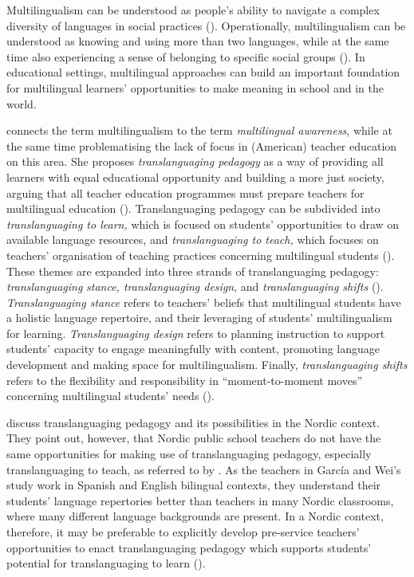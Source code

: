\documentclass[output=paper]{langscibook}
\begin{document}
Multilingualism can be understood as people’s ability to navigate a complex diversity of languages in social practices (\citealt{Hodge1988,Laursen2019}). Operationally, multilingualism can be understood as knowing and using more than two languages, while at the same time also experiencing a sense of belonging to specific social groups (\citealt{GarciaWei2014}). In educational settings, multilingual approaches can build an important foundation for multilingual learners’ opportunities to make meaning in school and in the world.

\begin{sloppypar}
\citet{Garcia2008} connects the term multilingualism to the term \textit{multilingual awareness}, while at the same time problematising the lack of focus in (American) teacher education on this area. She proposes \textit{translanguaging pedagogy} as a way of providing all learners with equal educational opportunity and building a more just society, arguing that all teacher education programmes must prepare teachers for multilingual education (\citealt{Garcia2017-1}). Translanguaging pedagogy can be subdivided into \textit{translanguaging to learn,} which is focused on students' opportunities to draw on available language resources, and \textit{translanguaging to teach,} which focuses on teachers' organisation of teaching practices concerning multilingual students (\citealt{GarciaWei2014}). These themes are expanded into three strands of translanguaging pedagogy: \textit{translanguaging} \textit{stance, translanguaging design}, and \textit{translanguaging shifts} (\citealt{Garcia2017-1}). \textit{Translanguaging stance} refers to teachers’ beliefs that multilingual students have a holistic language repertoire, and their leveraging of students’ multilingualism for learning. \textit{Translanguaging design} refers to planning instruction to support students’ capacity to engage meaningfully with content, promoting language development and making space for multilingualism. Finally, \textit{translanguaging shifts} refers to the flexibility and responsibility in “moment-to-moment moves” concerning multilingual students’ needs (\citealt[61]{Garcia2017-1}).
\end{sloppypar}

\citet{DaugaardLaursen2021} discuss translanguaging pedagogy and its possibilities in the Nordic context. They point out, however, that Nordic public school teachers do not have the same opportunities for making use of translanguaging pedagogy, especially translanguaging to teach, as referred to by \citet{GarciaWei2014}. As the teachers in García and Wei’s study work in Spanish and English bilingual contexts, they understand their students’ language repertories better than teachers in many Nordic classrooms, where many different language backgrounds are present. In a Nordic context, therefore, it may be preferable to explicitly develop pre-service teachers’ opportunities to enact translanguaging pedagogy which supports students’ potential for translanguaging to learn (\citealt{DaugaardLaursen2021}).
\end{document}

